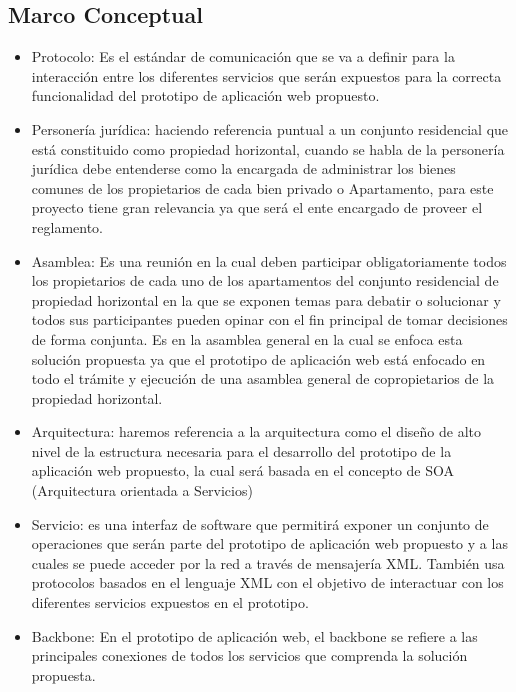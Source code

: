 \newpage

\subsection{Marco Conceptual}
\begin{itemize}
	
\item Protocolo: Es el estándar de comunicación que se va a definir para la interacción entre los diferentes servicios que serán expuestos para la correcta funcionalidad del prototipo de aplicación web propuesto.

\item Personería jurídica: haciendo referencia puntual a un conjunto residencial que está constituido como propiedad horizontal, cuando se habla de la personería jurídica debe entenderse como la encargada de administrar los bienes comunes de los propietarios de cada bien privado o Apartamento, para este proyecto tiene gran relevancia ya que será el ente encargado de proveer el reglamento.
  
\item Asamblea: Es una reunión en la cual deben participar obligatoriamente todos los propietarios de cada uno de los apartamentos del conjunto residencial de propiedad horizontal en la que se exponen temas para debatir o solucionar y todos sus participantes pueden opinar con el fin principal de tomar decisiones de forma conjunta. Es en la asamblea general en la cual se enfoca esta solución propuesta ya que el prototipo de aplicación web está enfocado en todo el trámite y ejecución de una asamblea general de copropietarios de la propiedad horizontal.

\item Arquitectura: haremos referencia a la arquitectura como el diseño de alto nivel de la estructura necesaria para el desarrollo del prototipo de la aplicación web propuesto, la cual será basada en el concepto de SOA (Arquitectura orientada a Servicios)

\item Servicio: es una interfaz de software que  permitirá exponer un conjunto de operaciones que serán parte del prototipo de aplicación web propuesto y a las cuales se puede acceder por la red a través de mensajería XML. También usa protocolos basados en el lenguaje XML con el objetivo de interactuar con los diferentes servicios expuestos en el prototipo.

\item Backbone: En el prototipo de aplicación web, el backbone  se refiere a las principales conexiones de todos los servicios que comprenda la solución propuesta.


\end{itemize}
